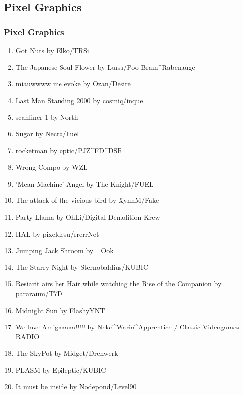 \documentclass{beamer}
\begin{document}
\subsection{Pixel Graphics}
\begin{frame}
  \frametitle{Pixel Graphics}
  \begin{enumerate}
  \item Got Nuts by Elko/TRSi
  \item The Japanese Soul Flower by Luisa/Poo-Brain\^{}Rabenauge
  \item miauwwww me evoke by Ozan/Desire
  \item Last Man Standing 2000 by cosmiq/inque
  \item scanliner 1 by North
  \item Sugar by Necro/Fuel
  \item rocketman by optic/PJZ\^{}FD\^{}DSR
  \item Wrong Compo by WZL
  \item 'Mean Machine' Angel by The Knight/FUEL
  \item The attack of the vicious bird by XynnM/Fake
  \item Party Llama by OhLi/Digital Demolition Krew
  \end{enumerate}
\end{frame}
\begin{frame}
  \begin{enumerate}
    \setcounter{enumi}{11}
  \item HAL by pixeldesu/rrerrNet
  \item Jumping Jack Shroom by \_Ook
  \item The Starry Night by Sternobaldius/KUBIC
  \item Resiarit airs her Hair while watching the Rise of the Companion by pararaum/T7D
  \item Midnight Sun by FlashyYNT
  \item We love Amigaaaaa!!!!! by Neko\^{}Wario\^{}Apprentice / Classic Videogames RADIO
  \item The SkyPot by Midget/Drehwerk
  \item PLASM by Epileptic/KUBIC
  \item It must be inside by Nodepond/Level90
  \end{enumerate}
\end{frame}
\end{document}
